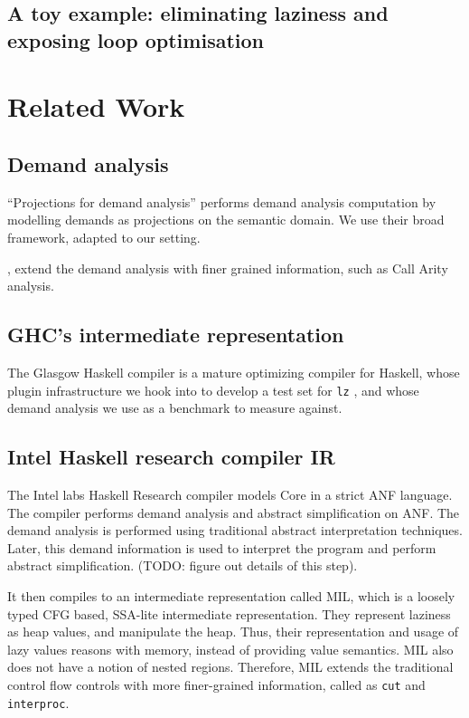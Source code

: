 \documentclass[sigplan,\review anonymous]{acmart}
\newcommand{\lz}{\texttt{lz} }
\begin{document}
{\subsection{A toy example: eliminating laziness and exposing loop optimisation}



\section{Related Work}

\subsection{Demand analysis}
\cite{wadler1987projections} ``Projections for demand analysis'' performs
demand analysis computation by modelling demands as projections on the semantic
domain. We use their broad framework, adapted to our setting. 

\cite{grafcall}, \cite{breitner2014call} extend the demand analysis with
finer grained information, such as Call Arity analysis.

\subsection{GHC's intermediate representation}

The Glasgow Haskell compiler \cite{jones1993glasgow} is a mature optimizing
compiler for Haskell, whose plugin infrastructure we hook into to  develop a test
set for \lz, and whose demand analysis we use as a benchmark to measure against.

\subsection{Intel Haskell research compiler IR}
The Intel labs Haskell Research compiler \cite{liu2013intel} models Core in a
strict ANF language. The compiler performs demand analysis and abstract
simplification on ANF. The demand analysis is performed using traditional
abstract interpretation techniques. Later, this demand information is used
to interpret the program and perform abstract simplification. (TODO: figure out
details of this step).

It then compiles to an intermediate representation called MIL,
which is a loosely typed CFG based, SSA-lite intermediate representation.  They
represent laziness as heap values, and manipulate the heap. Thus, their
representation and usage of lazy values reasons with memory, instead of
providing value semantics.
MIL also does not have a notion of nested regions. Therefore, MIL extends
the traditional control flow controls with more finer-grained information,
called as \texttt{cut} and \texttt{interproc}.


}
\end{document}
